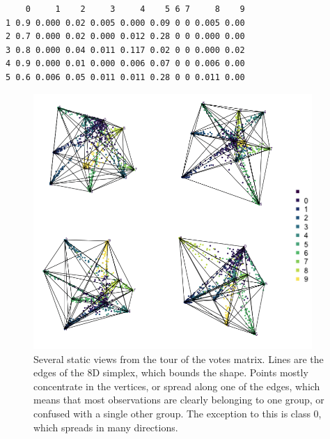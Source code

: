 \documentclass[
  letterpaper,
]{krantz}
\newenvironment{Shaded}{\begin{snugshade}}{\end{snugshade}}
\newcommand{\DecValTok}[1]{\textcolor[rgb]{0.68,0.00,0.00}{#1}}
\newcommand{\FunctionTok}[1]{\textcolor[rgb]{0.28,0.35,0.67}{#1}}
\newcommand{\NormalTok}[1]{\textcolor[rgb]{0.00,0.23,0.31}{#1}}
\newcommand{\SpecialCharTok}[1]{\textcolor[rgb]{0.37,0.37,0.37}{#1}}
\begin{document}
\begin{Shaded}
\end{Shaded}

\begin{verbatim}
    0     1    2     3     4    5 6 7     8    9
1 0.9 0.000 0.02 0.005 0.000 0.09 0 0 0.005 0.00
2 0.7 0.000 0.02 0.000 0.012 0.28 0 0 0.000 0.00
3 0.8 0.000 0.04 0.011 0.117 0.02 0 0 0.000 0.02
4 0.9 0.000 0.01 0.000 0.006 0.07 0 0 0.006 0.00
5 0.6 0.006 0.05 0.011 0.011 0.28 0 0 0.011 0.00
\end{verbatim}

\begin{figure}

\begin{minipage}{0.50\linewidth}

\includegraphics[width=4.16667in,height=\textheight,keepaspectratio]{images/ft-votes.png}

\end{minipage}%

\caption{\label{fig-ft-votes-pdf}Several static views from the tour of
the votes matrix. Lines are the edges of the 8D simplex, which bounds
the shape. Points mostly concentrate in the vertices, or spread along
one of the edges, which means that most observations are clearly
belonging to one group, or confused with a single other group. The
exception to this is class 0, which spreads in many directions.}

\end{figure}%
\end{document}
